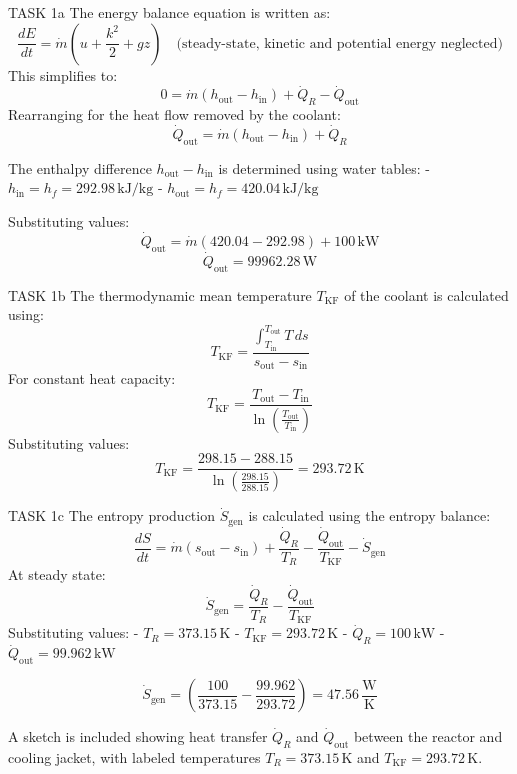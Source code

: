 TASK 1a  
The energy balance equation is written as:  
\[
\frac{dE}{dt} = \dot{m}(u + \frac{k^2}{2} + gz) \quad \text{(steady-state, kinetic and potential energy neglected)}
\]  
This simplifies to:  
\[
0 = \dot{m}(h_{\text{out}} - h_{\text{in}}) + \dot{Q}_R - \dot{Q}_{\text{out}}
\]  
Rearranging for the heat flow removed by the coolant:  
\[
\dot{Q}_{\text{out}} = \dot{m}(h_{\text{out}} - h_{\text{in}}) + \dot{Q}_R
\]  

The enthalpy difference \( h_{\text{out}} - h_{\text{in}} \) is determined using water tables:  
- \( h_{\text{in}} = h_f = 292.98 \, \text{kJ/kg} \)  
- \( h_{\text{out}} = h_f = 420.04 \, \text{kJ/kg} \)  

Substituting values:  
\[
\dot{Q}_{\text{out}} = \dot{m}(420.04 - 292.98) + 100 \, \text{kW}
\]  
\[
\dot{Q}_{\text{out}} = 99962.28 \, \text{W}
\]  

TASK 1b  
The thermodynamic mean temperature \( T_{\text{KF}} \) of the coolant is calculated using:  
\[
T_{\text{KF}} = \frac{\int_{T_{\text{in}}}^{T_{\text{out}}} T \, ds}{s_{\text{out}} - s_{\text{in}}}
\]  
For constant heat capacity:  
\[
T_{\text{KF}} = \frac{T_{\text{out}} - T_{\text{in}}}{\ln\left(\frac{T_{\text{out}}}{T_{\text{in}}}\right)}
\]  
Substituting values:  
\[
T_{\text{KF}} = \frac{298.15 - 288.15}{\ln\left(\frac{298.15}{288.15}\right)} = 293.72 \, \text{K}
\]  

TASK 1c  
The entropy production \( \dot{S}_{\text{gen}} \) is calculated using the entropy balance:  
\[
\frac{dS}{dt} = \dot{m}(s_{\text{out}} - s_{\text{in}}) + \frac{\dot{Q}_R}{T_R} - \frac{\dot{Q}_{\text{out}}}{T_{\text{KF}}} - \dot{S}_{\text{gen}}
\]  
At steady state:  
\[
\dot{S}_{\text{gen}} = \frac{\dot{Q}_R}{T_R} - \frac{\dot{Q}_{\text{out}}}{T_{\text{KF}}}
\]  
Substituting values:  
- \( T_R = 373.15 \, \text{K} \)  
- \( T_{\text{KF}} = 293.72 \, \text{K} \)  
- \( \dot{Q}_R = 100 \, \text{kW} \)  
- \( \dot{Q}_{\text{out}} = 99.962 \, \text{kW} \)  

\[
\dot{S}_{\text{gen}} = \left(\frac{100}{373.15} - \frac{99.962}{293.72}\right) = 47.56 \, \frac{\text{W}}{\text{K}}
\]  

A sketch is included showing heat transfer \( \dot{Q}_R \) and \( \dot{Q}_{\text{out}} \) between the reactor and cooling jacket, with labeled temperatures \( T_R = 373.15 \, \text{K} \) and \( T_{\text{KF}} = 293.72 \, \text{K} \).